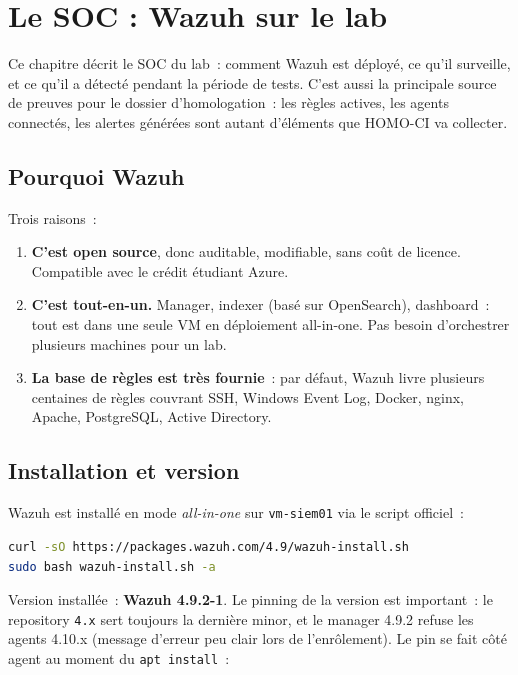 \chapter{Le SOC : Wazuh sur le lab}
\label{ch:soc-wazuh}

Ce chapitre décrit le SOC du lab~: comment Wazuh est déployé, ce
qu'il surveille, et ce qu'il a détecté pendant la période de
tests. C'est aussi la principale source de preuves pour le
dossier d'homologation~: les règles actives, les agents
connectés, les alertes générées sont autant d'éléments que
HOMO-CI va collecter.

\section{Pourquoi Wazuh}

Trois raisons~:

\begin{enumerate}
  \item \textbf{C'est open source}, donc auditable, modifiable,
    sans coût de licence. Compatible avec le crédit étudiant
    Azure.
  \item \textbf{C'est tout-en-un.} Manager, indexer (basé sur
    OpenSearch), dashboard~: tout est dans une seule VM en
    déploiement all-in-one. Pas besoin d'orchestrer plusieurs
    machines pour un lab.
  \item \textbf{La base de règles est très fournie}~: par défaut,
    Wazuh livre plusieurs centaines de règles couvrant SSH,
    Windows Event Log, Docker, nginx, Apache, PostgreSQL,
    Active Directory.
\end{enumerate}

\section{Installation et version}

Wazuh est installé en mode \emph{all-in-one} sur \texttt{vm-siem01}
via le script officiel~:

\begin{lstlisting}[language=bash,caption={Installation Wazuh
all-in-one (extrait).}]
curl -sO https://packages.wazuh.com/4.9/wazuh-install.sh
sudo bash wazuh-install.sh -a
\end{lstlisting}

Version installée~: \textbf{Wazuh 4.9.2-1}. Le pinning de la
version est important~: le repository \texttt{4.x} sert toujours
la dernière minor, et le manager 4.9.2 refuse les agents 4.10.x
(message d'erreur peu clair lors de l'enrôlement). Le pin se fait
côté agent au moment du \texttt{apt install}~:

